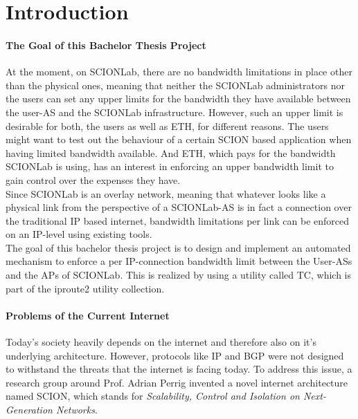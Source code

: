 \chapter{Introduction}

\subsubsection{The Goal of this Bachelor Thesis Project}

At the moment, on \acs{SCIONLab}, there are no bandwidth limitations in place other than the physical ones, meaning that neither the \acs{SCIONLab} administrators nor the users can set any upper limits for the bandwidth they have available between the user-\acs{AS} and the \acs{SCIONLab} infrastructure. However, such an upper limit is desirable for both, the users as well as \acs{ETH}, for different reasons. The users might want to test out the behaviour of a certain \acs{SCION} based application when having limited bandwidth available. And \acs{ETH}, which pays for the bandwidth \acs{SCIONLab} is using, has an interest in enforcing an upper bandwidth limit to gain control over the expenses they have.
\\
Since \acs{SCIONLab} is an overlay network, meaning that whatever looks like a physical link from the perspective of a \acs{SCIONLab}-\acs{AS} is in fact a connection over the traditional \acs{IP} based internet, bandwidth limitations per link can be enforced on an \acs{IP}-level using existing tools.
\\
The goal of this bachelor thesis project is to design and implement an automated mechanism to enforce a per \acs{IP}-connection bandwidth limit between the User-\acsp{AS} and the \aclp{AP} of \acs{SCIONLab}. This is realized by using a utility called \ac{TC}, which is part of the iproute2 utility collection.

\newpage

\subsubsection{Problems of the Current Internet}

Today's society heavily depends on the internet and therefore also on it's underlying architecture. However, protocols like \ac{IP} and \ac{BGP} were not designed to withstand the threats that the internet is facing today. To address this issue, a research group around Prof. Adrian Perrig invented a novel internet architecture named \ac{SCION}, which stands for \textit{Scalability, Control and Isolation on Next-Generation Networks}.

